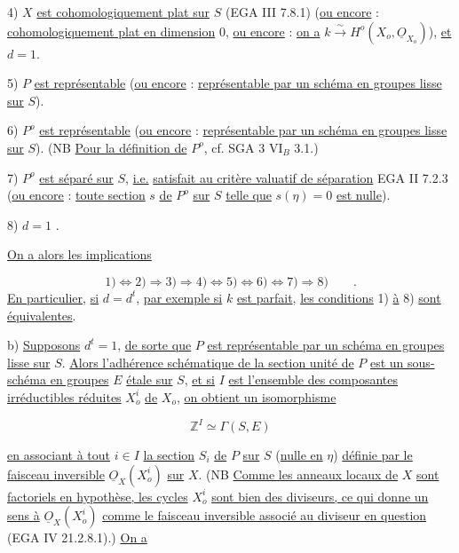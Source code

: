 
4) $X$ \underline{est cohomologiquement plat sur} $S$ (EGA III 7.8.1) (\underline{ou encore} : \underline{cohomologiquement plat en dimension} $0$, \underline{ou encore} : \underline{on a} $k \stackrel{\sim}{\longrightarrow} H^o(X_o,\underline{O}_{X_o})$), \underline{et} $d=1$.

5) $P$ \underline{est représentable} (\underline{ou encore} : \underline{représentable par un schéma en groupes lisse sur} $S$).

6) $P^o$ \underline{est représentable} (\underline{ou encore} : \underline{représentable par un schéma en groupes lisse sur} $S$). (NB \underline{Pour la définition de} $P^o$, cf. SGA 3 $\mathrm{VI}_B$ 3.1.)

7) $P^o$ \underline{est séparé sur} $S$, \underline{i.e.} \underline{satisfait au critère valuatif de séparation} EGA II 7.2.3 (\underline{ou encore} : \underline{toute section} $s$ \underline{de} $P^o$ \underline{sur} $S$ \underline{telle que} $s(\eta) = 0$ \underline{est nulle}).

8) $d=1$ .

\underline{On a alors les implications}

\begin{equation}\tag{12.1.4}
1) \Longleftrightarrow 2) \Longrightarrow 3) \Longrightarrow 4) \Longleftrightarrow 5) \Longleftrightarrow 6) \Longleftrightarrow 7) \Longrightarrow 8) \qquad .
\end{equation}
\underline{En particulier}, \underline{si} $d=d^t$, \underline{par exemple si} $k$ \underline{est parfait}, \underline{les conditions} 1) \underline{à} 8) \underline{sont équivalentes}.

b) \underline{Supposons} $d^t=1$, \underline{de sorte que} $P$ \underline{est représentable par un schéma en groupes lisse sur} $S$. \underline{Alors l'adhérence schématique de la section unité de} $P$ \underline{est un sous-schéma en groupes} $E$ \underline{étale sur} $S$, \underline{et si} $I$ \underline{est l'ensemble des composantes irréductibles réduites} $X_o^i$ \underline{de} $X_o$, \underline{on obtient un isomorphisme}

\begin{equation}\tag{12.1.5}
\mathbb{Z}^I \simeq \Gamma(S,E)
\end{equation}


\underline{en associant à tout} $i \in I$ \underline{la section} $S_i$ \underline{de} $P$ \underline{sur} $S$ (\underline{nulle en} $\eta$) \underline{définie par le faisceau inversible} $\underline{O}_X(X_o^i)$ \underline{sur} $X$. (NB \underline{Comme les anneaux locaux de} $X$ \underline{sont factoriels en hypothèse, les cycles} $X_o^i$ \underline{sont bien des diviseurs, ce qui donne un sens à} $\underline{O}_X(X_o^i)$ \underline{comme le faisceau inversible associé au diviseur en question} (EGA IV 21.2.8.1).) \underline{On a}

